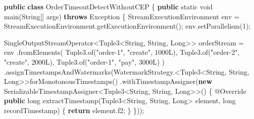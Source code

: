 \documentclass[cn,11pt,chinese]{elegantbook}
\newenvironment{Shaded}{}{}
\newcommand{\AttributeTok}[1]{\textcolor[rgb]{0.49,0.56,0.16}{#1}}
\newcommand{\BuiltInTok}[1]{#1}
\newcommand{\DataTypeTok}[1]{\textcolor[rgb]{0.56,0.13,0.00}{#1}}
\newcommand{\DecValTok}[1]{\textcolor[rgb]{0.25,0.63,0.44}{#1}}
\newcommand{\FunctionTok}[1]{\textcolor[rgb]{0.02,0.16,0.49}{#1}}
\newcommand{\KeywordTok}[1]{\textcolor[rgb]{0.00,0.44,0.13}{\textbf{#1}}}
\newcommand{\NormalTok}[1]{#1}
\newcommand{\StringTok}[1]{\textcolor[rgb]{0.25,0.44,0.63}{#1}}
\begin{document}
\begin{Shaded}
\begin{Highlighting}[]
\KeywordTok{public} \KeywordTok{class}\NormalTok{ OrderTimeoutDetectWithoutCEP \{}
    \KeywordTok{public} \DataTypeTok{static} \DataTypeTok{void} \FunctionTok{main}\NormalTok{(}\BuiltInTok{String}\NormalTok{[] args) }\KeywordTok{throws} \BuiltInTok{Exception}\NormalTok{ \{}
\NormalTok{        StreamExecutionEnvironment env = StreamExecutionEnvironment.}\FunctionTok{getExecutionEnvironment}\NormalTok{();}
\NormalTok{        env.}\FunctionTok{setParallelism}\NormalTok{(}\DecValTok{1}\NormalTok{);}

\NormalTok{        SingleOutputStreamOperator\textless{}Tuple3\textless{}}\BuiltInTok{String}\NormalTok{, }\BuiltInTok{String}\NormalTok{, }\BuiltInTok{Long}\NormalTok{\textgreater{}\textgreater{} orderStream = env}
\NormalTok{            .}\FunctionTok{fromElements}\NormalTok{(}
\NormalTok{                Tuple3.}\FunctionTok{of}\NormalTok{(}\StringTok{"order{-}1"}\NormalTok{, }\StringTok{"create"}\NormalTok{, }\DecValTok{1000L}\NormalTok{),}
\NormalTok{                Tuple3.}\FunctionTok{of}\NormalTok{(}\StringTok{"order{-}2"}\NormalTok{, }\StringTok{"create"}\NormalTok{, }\DecValTok{2000L}\NormalTok{),}
\NormalTok{                Tuple3.}\FunctionTok{of}\NormalTok{(}\StringTok{"order{-}1"}\NormalTok{, }\StringTok{"pay"}\NormalTok{, }\DecValTok{3000L}\NormalTok{)}
\NormalTok{            )}
\NormalTok{            .}\FunctionTok{assignTimestampsAndWatermarks}\NormalTok{(WatermarkStrategy.\textless{}Tuple3\textless{}}\BuiltInTok{String}\NormalTok{, }\BuiltInTok{String}\NormalTok{, }\BuiltInTok{Long}\NormalTok{\textgreater{}\textgreater{}}\FunctionTok{forMonotonousTimestamps}\NormalTok{()}
\NormalTok{                .}\FunctionTok{withTimestampAssigner}\NormalTok{(}\KeywordTok{new}\NormalTok{ SerializableTimestampAssigner\textless{}Tuple3\textless{}}\BuiltInTok{String}\NormalTok{, }\BuiltInTok{String}\NormalTok{, }\BuiltInTok{Long}\NormalTok{\textgreater{}\textgreater{}() \{}
                    \AttributeTok{@Override}
                    \KeywordTok{public} \DataTypeTok{long} \FunctionTok{extractTimestamp}\NormalTok{(Tuple3\textless{}}\BuiltInTok{String}\NormalTok{, }\BuiltInTok{String}\NormalTok{, }\BuiltInTok{Long}\NormalTok{\textgreater{} element, }\DataTypeTok{long}\NormalTok{ recordTimestamp) \{}
                        \KeywordTok{return}\NormalTok{ element.}\FunctionTok{f2}\NormalTok{;}
\NormalTok{                    \}}
\NormalTok{                \}));}


\end{Highlighting}
\end{Shaded}
\end{document}

